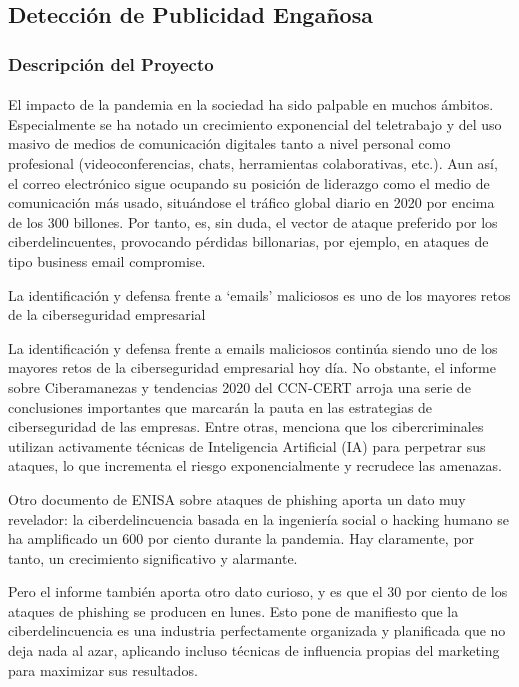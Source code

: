 \documentclass{article}
\begin{document}
\subsection{Detección de Publicidad Engañosa}

\subsubsection{Descripción del Proyecto}
\paragraph{}
El impacto de la pandemia en la sociedad ha sido palpable en muchos ámbitos. Especialmente se ha notado un crecimiento exponencial del teletrabajo y del uso masivo de medios de comunicación digitales tanto a nivel personal como profesional (videoconferencias, chats, herramientas colaborativas, etc.). Aun así, el correo electrónico sigue ocupando su posición de liderazgo como el medio de comunicación más usado, situándose el tráfico global diario en 2020 por encima de los 300 billones. Por tanto, es, sin duda, el vector de ataque preferido por los ciberdelincuentes, provocando pérdidas billonarias, por ejemplo, en ataques de tipo business email compromise.

La identificación y defensa frente a ‘emails’ maliciosos es uno de los mayores retos de la ciberseguridad empresarial

La identificación y defensa frente a emails maliciosos continúa siendo uno de los mayores retos de la ciberseguridad empresarial hoy día. No obstante, el informe sobre Ciberamanezas y tendencias 2020 del CCN-CERT arroja una serie de conclusiones importantes que marcarán la pauta en las estrategias de ciberseguridad de las empresas. Entre otras, menciona que los cibercriminales utilizan activamente técnicas de Inteligencia Artificial (IA) para perpetrar sus ataques, lo que incrementa el riesgo exponencialmente y recrudece las amenazas.

Otro documento de ENISA sobre ataques de phishing aporta un dato muy revelador: la ciberdelincuencia basada en la ingeniería social o hacking humano se ha amplificado un 600 por ciento durante la pandemia. Hay claramente, por tanto, un crecimiento significativo y alarmante.

Pero el informe también aporta otro dato curioso, y es que el 30 por ciento de los ataques de phishing se producen en lunes. Esto pone de manifiesto que la ciberdelincuencia es una industria perfectamente organizada y planificada que no deja nada al azar, aplicando incluso técnicas de influencia propias del marketing para maximizar sus resultados.
\end{document}
